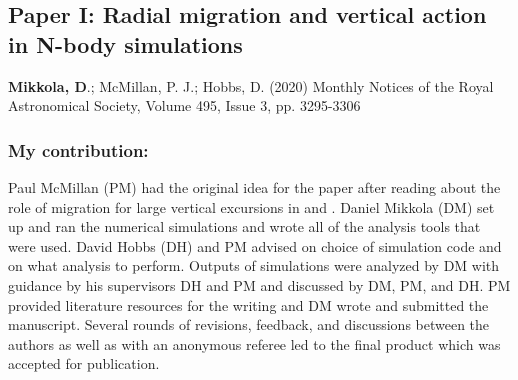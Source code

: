 \subsection*{Paper I: Radial migration and vertical action in N-body simulations}
\textbf{Mikkola, D}.; McMillan, P. J.; Hobbs, D. (2020) \newline
Monthly Notices of the Royal Astronomical Society, Volume 495, Issue 3, pp. 3295-3306 \newline

\subsubsection*{My contribution:}
Paul McMillan (PM) had the original idea for the paper after reading about the role of migration for large vertical excursions in \cite{solway:12} and \cite{vera-ciro:14, vera-ciro:16b}. Daniel Mikkola (DM) set up and ran the numerical simulations and wrote all of the analysis tools that were used. David Hobbs (DH) and PM advised on choice of simulation code and on what analysis to perform. Outputs of simulations were analyzed by DM with guidance by his supervisors DH and PM and discussed by DM, PM, and DH. PM provided literature resources for the writing and DM wrote and submitted the manuscript. Several rounds of revisions, feedback, and discussions between the authors as well as with an anonymous referee led to the final product which was accepted for publication.